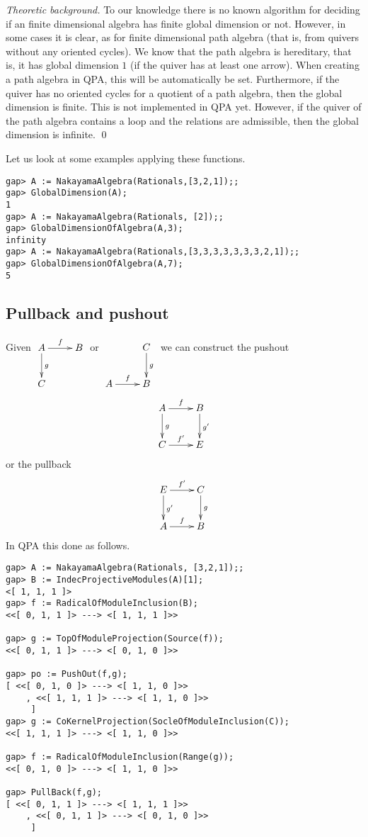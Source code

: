 \documentclass{amsart}
\theoremstyle{definition}
\theoremstyle{theoretic}
\newenvironment{theoback}
{\medskip\footnotesize\textit{Theoretic background.} }
{\qed\par\medskip}
\begin{document}
\begin{theoback}
  To our knowledge there is no known algorithm for deciding if an
  finite dimensional algebra has finite global dimension or not.
  However, in some cases it is clear, as for finite dimensional path
  algebra (that is, from quivers without any oriented cycles).  We
  know that the path algebra is hereditary, that is, it has global
  dimension $1$ (if the quiver has at least one arrow).  When creating
  a path algebra in QPA, this will be automatically be set.
  Furthermore, if the quiver has no oriented cycles for a quotient of
  a path algebra, then the global dimension is finite.  This is not
  implemented in QPA yet.  However, if the quiver of the path algebra
  contains a loop and the relations are admissible, then the global
  dimension is infinite.
\end{theoback}

Let us look at some examples applying these functions.
\begin{verbatim}
gap> A := NakayamaAlgebra(Rationals,[3,2,1]);;
gap> GlobalDimension(A);
1
gap> A := NakayamaAlgebra(Rationals, [2]);;
gap> GlobalDimensionOfAlgebra(A,3);
infinity
gap> A := NakayamaAlgebra(Rationals,[3,3,3,3,3,3,3,2,1]);;
gap> GlobalDimensionOfAlgebra(A,7);
5
\end{verbatim}

\subsection{Pullback and pushout}
Given $\xymatrix{A\ar[r]^f\ar[d]^g & B\\ C & }$ or $\xymatrix{ & C\ar[d]^g\\
  A\ar[r]^f & B}$
we can construct the pushout 
\[\xymatrix{A\ar[r]^f\ar[d]^g & B\ar[d]^{g'}\\ C\ar[r]^{f'} & E}\]
or the pullback 
\[\xymatrix{E\ar[r]^{f'}\ar[d]^{g'} & C\ar[d]^g\\ A\ar[r]^f & B}\]
In QPA this done as follows.
\begin{verbatim}
gap> A := NakayamaAlgebra(Rationals, [3,2,1]);;
gap> B := IndecProjectiveModules(A)[1];
<[ 1, 1, 1 ]>
gap> f := RadicalOfModuleInclusion(B);
<<[ 0, 1, 1 ]> ---> <[ 1, 1, 1 ]>>

gap> g := TopOfModuleProjection(Source(f));
<<[ 0, 1, 1 ]> ---> <[ 0, 1, 0 ]>>

gap> po := PushOut(f,g);
[ <<[ 0, 1, 0 ]> ---> <[ 1, 1, 0 ]>>
    , <<[ 1, 1, 1 ]> ---> <[ 1, 1, 0 ]>>
     ]
gap> g := CoKernelProjection(SocleOfModuleInclusion(C));
<<[ 1, 1, 1 ]> ---> <[ 1, 1, 0 ]>>

gap> f := RadicalOfModuleInclusion(Range(g));
<<[ 0, 1, 0 ]> ---> <[ 1, 1, 0 ]>>

gap> PullBack(f,g);
[ <<[ 0, 1, 1 ]> ---> <[ 1, 1, 1 ]>>
    , <<[ 0, 1, 1 ]> ---> <[ 0, 1, 0 ]>>
     ]
\end{verbatim}
\end{document}
